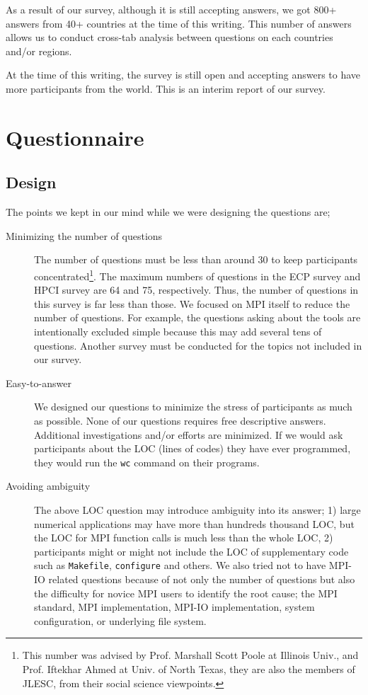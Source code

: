 \documentclass[submit,techrep,noauthor,english]{ipsj}
\begin{document}
As a result of our survey, although it is still accepting answers, we
got 800+ answers from 40+ countries at the time of this writing.  This
number of answers allows us to conduct cross-tab analysis between
questions on each countries and/or regions.

At the time of this writing, the survey is still open and accepting
answers to have more participants from the world. This is an interim
report of our survey.

\section{Questionnaire}

\subsection{Design}

The points we kept in our mind while we were designing the
questions are; 


\begin{description}
\item[Minimizing the number of questions]
The number of questions must be less than around 30
to keep participants concentrated\footnote{This
  number was advised by Prof. Marshall Scott Poole at Illinois Univ.,
  and Prof. Iftekhar Ahmed at Univ. of North Texas, they are also
  the members of JLESC\cite{JLESC}, from their social science viewpoints.}.
The maximum numbers of questions in the ECP survey and HPCI survey are
64 and 75, respectively. Thus, the number of questions in this survey
is far less than those.  We focused on MPI itself to reduce the number
of questions.  For example, the questions asking about the tools are
intentionally excluded simple because this may add several tens of
questions. Another survey must be conducted for the topics not
included in our survey.

\item[Easy-to-answer]
We designed our questions to minimize the stress of participants as
much as possible. None of our questions requires free descriptive
answers. Additional investigations and/or efforts are minimized. If we
would ask participants about the LOC (lines of codes) they have ever
programmed, they would run the {\tt wc} command on their programs.  

\item[Avoiding ambiguity]
The above LOC question may introduce ambiguity into its answer; 1)
large numerical applications may have more than hundreds thousand LOC,
but the LOC for MPI function calls is much less than the whole LOC, 2)
participants might or might not include the LOC of supplementary code
such as {\tt Makefile}, {\tt configure} and others. 
We also tried not to have MPI-IO related questions because of not only
the number of questions but also the difficulty for novice MPI users
to identify the root cause; the MPI standard, MPI implementation,
MPI-IO implementation, system configuration, or underlying file
system. 
\end{description}
\end{document}

